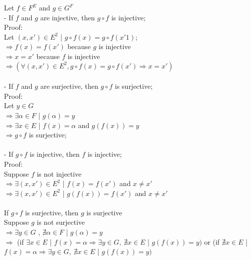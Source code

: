 \documentclass{article}
\begin{document}
\noindent Let $f \in F^E$ and $g \in G^F$\\
- If $f$ and $g$ are injective, then $g \circ f$ is injective;\\
Proof:\\
Let $ (x, x') \in E^2$ | $ g \circ f(x) = g \circ f(x'1) $;\\
$\Rightarrow f(x) = f(x')$ because $g$ is injective\\
$\Rightarrow x = x' $ because $f$ is injective\\
$\Rightarrow (\forall (x, x') \in E^2, g\circ
f(x) = g \circ f(x')\Rightarrow  x = x')$\\\\

\noindent - If $f$ and $g$ are surjective, then $g \circ f$ is surjective;\\
Proof:\\
Let $ y \in G $\\
$\Rightarrow \exists \alpha \in F $ | $ g(\alpha) = y$\\
$\Rightarrow \exists x \in E $ | $ f(x) = \alpha$ and $g(f(x)) = y$\\
$\Rightarrow g \circ f $ is surjective;\\\\

\noindent
- If $g \circ f$ is injective, then $f$ is injective;\\
Proof:\\
Suppose $f$ is not injective\\
$\Rightarrow \exists (x, x') \in E^2$ | $ f(x) = f(x') $
and $ x \neq x' $\\
$\Rightarrow \exists (x, x') \in E^2$ | $ g(f(x)) = f(x') $
and $ x \neq x' $\\\\

\noindent If $g \circ f$ is surjective, then $g$ is surjective\\
Suppose $g$ is not surjective\\
$\Rightarrow \exists y \in G$ , $\nexists \alpha \in F$ | $ g(\alpha) = y$\\
$\Rightarrow $ (if $\exists x \in E $ | $ f(x) = \alpha \Rightarrow 
\exists y \in G,\  \nexists x \in E $ | $ g(f(x)) = y)$ or
(if $\nexists x \in E $ | $ f(x) = \alpha \Rightarrow
\exists y \in G,\ \nexists x \in E $ | $ g(f(x)) = y)$
\end{document}
